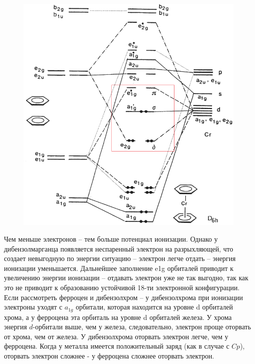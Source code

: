 \begin{figure}[H]
\centering
\includegraphics[scale=.600]{images/Benzol2Chromeorb.png}
\caption{}
\label{}
\end{figure}
Чем меньше электронов – тем больше потенциал ионизации. Однако у дибензолмарганца появляется неспаренный электрон на разрыхляющей, что создает невыгодную по энергии ситуацию – электрон легче отдать – энергия ионизации уменьшается. Дальнейшее заполнение e1g орбиталей приводит к увеличению энергии ионизации – отдавать электрон уже не так выгодно, так как это не приводит к образованию устойчивой 18-ти электронной конфигурации. 
Если рассмотреть ферроцен и дибензолхром – у дибензолхрома при ионизации электроны уходят с $a_{1g}$ орбитали, которая находится на уровне d орбиталей хрома, а у ферроцена эта орбиталь на уровне d орбиталей железа. У хрома энергия $d$-орбитали выше, чем у железа, следовательно, электрон проще оторвать от хрома, чем от железа. У дибензолхрома оторвать электрон легче, чем у ферроцена. 
Когда у металла имеется положительный заряд (как в случае с $Cp$), оторвать электрон сложнее - у ферроцена сложнее оторвать электрон. 


